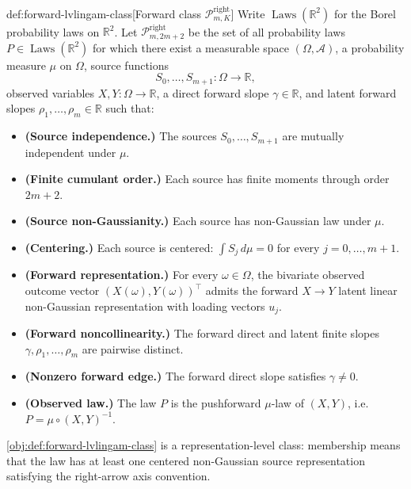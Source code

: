 \documentclass[11pt]{article}
\begin{document}
\begin{definitionv}{def:forward-lvlingam-class}[Forward class \(\mathcal P^{\mathrm{right}}_{m,K}\)]
Write \(\operatorname{Laws}(\mathbb R^2)\) for the Borel probability laws on \(\mathbb R^2\). Let \(\mathcal P^{\mathrm{right}}_{m,2m+2}\) be the set of all probability laws \(P\in \operatorname{Laws}(\mathbb R^2)\) for which there exist a measurable space \((\Omega,\mathcal A)\), a probability measure \(\mu\) on \(\Omega\), source functions
\[
S_0,\ldots,S_{m+1}:\Omega\to\mathbb R,
\]
observed variables \(X,Y:\Omega\to\mathbb R\), a direct forward slope \(\gamma\in\mathbb R\), and latent forward slopes \(\rho_1,\ldots,\rho_m\in\mathbb R\) such that:
\begin{itemize}
\item \textbf{(Source independence.)} The sources \(S_0,\ldots,S_{m+1}\) are mutually independent under \(\mu\).
\item \textbf{(Finite cumulant order.)} Each source has finite moments through order \(2m+2\).
\item \textbf{(Source non-Gaussianity.)} Each source has non-Gaussian law under \(\mu\).
\item \textbf{(Centering.)} Each source is centered: \(\int S_j\,d\mu=0\) for every \(j=0,\ldots,m+1\).
\item \textbf{(Forward representation.)} For every \(\omega\in\Omega\), the bivariate observed outcome vector \((X(\omega),Y(\omega))^\top\) admits the forward \(X\to Y\) latent linear non-Gaussian representation with loading vectors \(u_j\).
\item \textbf{(Forward noncollinearity.)} The forward direct and latent finite slopes \(\gamma,\rho_1,\ldots,\rho_m\) are pairwise distinct.
\item \textbf{(Nonzero forward edge.)} The forward direct slope satisfies \(\gamma\ne 0\).
\item \textbf{(Observed law.)} The law \(P\) is the pushforward \(\mu\)-law of \((X,Y)\), i.e. \(P=\mu\circ (X,Y)^{-1}\).
\end{itemize}
\end{definitionv}

\cref{obj:def:forward-lvlingam-class} is a representation-level class: membership means that the law has at least one centered non-Gaussian source representation satisfying the right-arrow axis convention.
\end{document}
